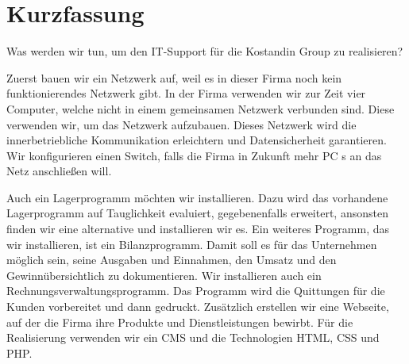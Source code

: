 %
%
\newpage

%
%
\section*{Kurzfassung}
Was werden wir tun, um den IT-Support f\"ur die Kostandin Group zu realisieren?

Zuerst bauen wir ein Netzwerk auf, weil es in dieser Firma noch kein funktionierendes Netzwerk gibt.
In der Firma verwenden wir zur Zeit vier Computer, welche nicht in einem gemeinsamen Netzwerk verbunden sind. Diese verwenden wir, um das Netzwerk aufzubauen. Dieses Netzwerk wird die innerbetriebliche Kommunikation erleichtern und Datensicherheit garantieren. Wir konfigurieren einen Switch, falls die Firma in Zukunft mehr PC s an das Netz anschlie\ss{}en will.

Auch ein Lagerprogramm m\"ochten wir installieren. Dazu wird das vorhandene Lagerprogramm auf Tauglichkeit evaluiert, gegebenenfalls erweitert, ansonsten finden wir eine alternative und installieren wir es.
Ein weiteres Programm, das wir installieren, ist ein Bilanzprogramm. Damit soll es f\"ur das Unternehmen m\"oglich sein, seine Ausgaben und Einnahmen, den Umsatz und den Gewinn\"ubersichtlich zu dokumentieren.
Wir installieren auch ein Rechnungsverwaltungsprogramm. Das Programm wird die Quittungen f\"ur die Kunden vorbereitet und dann gedruckt.
Zus\"atzlich erstellen wir eine Webseite, auf der die Firma ihre Produkte und Dienstleistungen bewirbt. F\"ur die Realisierung verwenden wir ein CMS und die Technologien HTML, CSS und PHP.

\color{black} 

